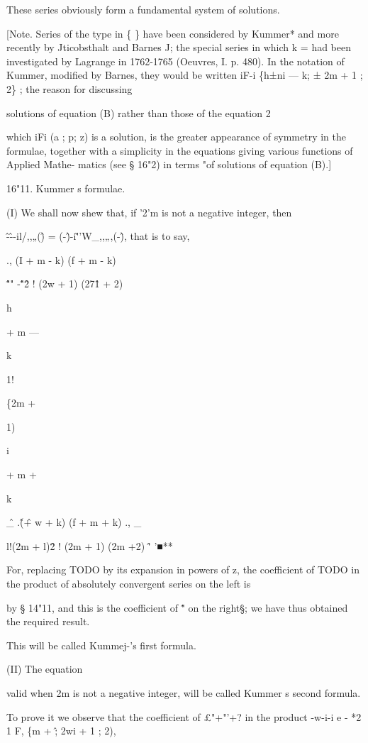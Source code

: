 These series obviously form a fundamental system of solutions.

[Note. Series of the type in \{ \} have been considered by Kummer* and
more recently by Jticobsthalt and Barnes J; the special series in
which k = had been investigated by Lagrange in 1762-1765 (Oeuvres, I.
p. 480). In the notation of Kummer, modified by Barnes, they would be
written iF-i \{h±ni — k; ± 2m + 1 ; 2\} ; the reason for discussing

solutions of equation (B) rather than those of the equation 2

which iFi (a ; p; z) is a solution, is the greater appearance of
symmetry in the formulae, together with a simplicity in the equations
giving various functions of Applied Mathe- matics (see § 16"2) in
terms "of solutions of equation (B).]

16"11. Kummer s formulae.

(I) We shall now shew that, if '2'm is not a negative integer, then

\^-\^--il/,,„(\^) = (-\^)-i\~''W\_,,„,(-\^), that is to say,

., (I + m - k) (f + m - k)

\^ "" -\^"\^ 2 ! (2w + 1) (27\^1 + 2)



h


+ m —


k


1!


\{2m +


1)


i


+ m +


k



\^ \_ .\^ (\^ + w + k) (f + m + k) ., \_

l!(2m + l)\^ 2 ! (2m + 1) (2m +2) \^' '■**

For, replacing TODO by its expansion in powers of z, the coefficient
of TODO in the product of absolutely convergent series on the left is


by § 14"11, and this is the coefficient of \^" on the right§; we have
thus obtained the required result.

This will be called Kummej-'s first formula.

(II) The equation



valid when 2m is not a negative integer, will be called Kummer s
second formula.

To prove it we observe that the coefficient of £"+"'+? in the product
-w-i-i e - *2 1 F, \{m + \^ ; 2wi + 1 ; 2),

